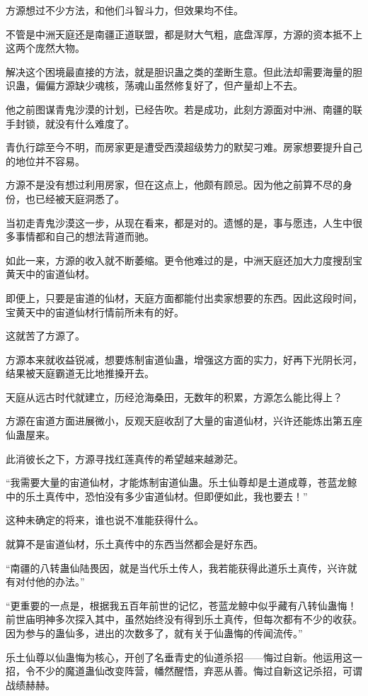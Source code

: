 \begin{this_body}
方源想过不少方法，和他们斗智斗力，但效果均不佳。

不管是中洲天庭还是南疆正道联盟，都是财大气粗，底盘浑厚，方源的资本抵不上这两个庞然大物。

解决这个困境最直接的方法，就是胆识蛊之类的垄断生意。但此法却需要海量的胆识蛊，偏偏方源缺少魂核，荡魂山虽然修复好了，但产量却上不去。

他之前图谋青鬼沙漠的计划，已经告吹。若是成功，此刻方源面对中洲、南疆的联手封锁，就没有什么难度了。

青仇行踪至今不明，而房家更是遭受西漠超级势力的默契刁难。房家想要提升自己的地位并不容易。

方源不是没有想过利用房家，但在这点上，他颇有顾忌。因为他之前算不尽的身份，也已经被天庭洞悉了。

当初走青鬼沙漠这一步，从现在看来，都是对的。遗憾的是，事与愿违，人生中很多事情都和自己的想法背道而驰。

如此一来，方源的收入就不断萎缩。更令他难过的是，中洲天庭还加大力度搜刮宝黄天中的宙道仙材。

即便上，只要是宙道的仙材，天庭方面都能付出卖家想要的东西。因此这段时间，宝黄天中的宙道仙材行情前所未有的好。

这就苦了方源了。

方源本来就收益锐减，想要炼制宙道仙蛊，增强这方面的实力，好再下光阴长河，结果被天庭霸道无比地推搡开去。

天庭从远古时代就建立，历经沧海桑田，无数年的积累，方源怎么能比得上？

方源在宙道方面进展微小，反观天庭收刮了大量的宙道仙材，兴许还能炼出第五座仙蛊屋来。

此消彼长之下，方源寻找红莲真传的希望越来越渺茫。

“我需要大量的宙道仙材，才能炼制宙道仙蛊。乐土仙尊却是土道成尊，苍蓝龙鲸中的乐土真传中，恐怕没有多少宙道仙材。但即便如此，我也要去！”

这种未确定的将来，谁也说不准能获得什么。

就算不是宙道仙材，乐土真传中的东西当然都会是好东西。

“南疆的八转蛊仙陆畏因，就是当代乐土传人，我若能获得此道乐土真传，兴许就有对付他的办法。”

“更重要的一点是，根据我五百年前世的记忆，苍蓝龙鲸中似乎藏有八转仙蛊悔！前世庙明神多次探入其中，虽然始终没有得到乐土真传，但每次都有不少的收获。因为参与的蛊仙多，进出的次数多了，就有关于仙蛊悔的传闻流传。”

乐土仙尊以仙蛊悔为核心，开创了名垂青史的仙道杀招——悔过自新。他运用这一招，令不少的魔道蛊仙改变阵营，幡然醒悟，弃恶从善。悔过自新这记杀招，可谓战绩赫赫。


\end{this_body}
